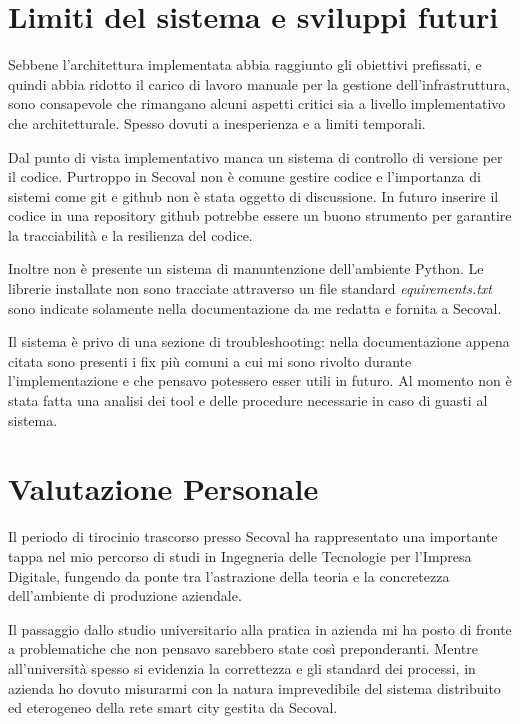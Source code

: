 \documentclass[12pt, a4paper, oneside]{report}
\begin{document}
\section{Limiti del sistema e sviluppi futuri}

Sebbene l'architettura implementata abbia raggiunto gli obiettivi prefissati, e quindi abbia ridotto il carico di lavoro manuale per la gestione dell'infrastruttura, sono consapevole che rimangano alcuni aspetti critici sia a livello implementativo che architetturale.
Spesso dovuti a inesperienza e a limiti temporali.

Dal punto di vista implementativo manca un sistema di controllo di versione per il codice. Purtroppo in Secoval non è comune gestire codice e l'importanza di sistemi come git \parencite{git_scm} e github non è stata oggetto di discussione. In futuro inserire il codice in una repository github potrebbe essere un buono strumento per garantire la tracciabilità e la resilienza del codice.

Inoltre non è presente un sistema di manuntenzione dell'ambiente Python.
Le librerie installate non sono tracciate attraverso un file standard \textit{equirements.txt} sono indicate solamente nella documentazione da me redatta e fornita a Secoval.

Il sistema è privo di una sezione di troubleshooting: nella documentazione appena citata sono presenti i fix più comuni a cui mi sono rivolto durante l'implementazione e che pensavo potessero esser utili in futuro. Al momento non è stata fatta una analisi dei tool e delle procedure necessarie in caso di guasti al sistema.

\section{Valutazione Personale}

Il periodo di tirocinio trascorso presso Secoval ha rappresentato una importante tappa nel mio percorso di studi in Ingegneria delle Tecnologie per l'Impresa Digitale, fungendo da ponte tra l'astrazione della teoria e la concretezza dell'ambiente di produzione aziendale.


Il passaggio dallo studio universitario alla pratica in azienda mi ha posto di fronte a problematiche che non pensavo sarebbero state così preponderanti. Mentre all'università spesso si evidenzia la correttezza e gli standard dei processi, in azienda ho dovuto misurarmi con la natura imprevedibile del sistema distribuito ed eterogeneo della rete smart city gestita da Secoval.
\end{document}
